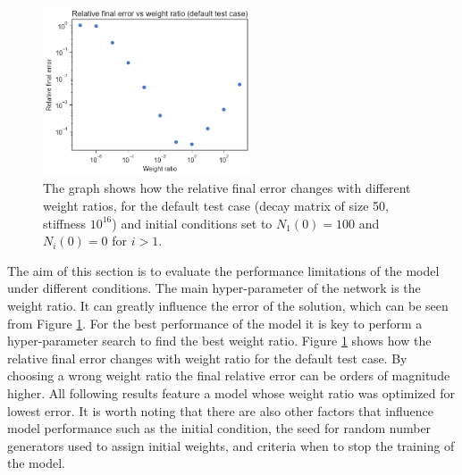 \documentclass[10pt]{article}
\begin{document}
\begin{figure}
    \centering
    \includegraphics[width=0.55\textwidth]{error_vs_ratio.png}
    \caption{The graph shows how the relative final error changes with different weight ratios, for the default test case (decay matrix of size 50, stiffness $10^{16}$) and initial conditions set to $N_1(0) = 100$ and $N_i(0) = 0$ for $i > 1$.}
    \label{fig:error_vs_ratio}
\end{figure}

The aim of this section is to evaluate the performance limitations of the model under different conditions. The main hyper-parameter of the network is the weight ratio. It can greatly influence the error of the solution, which can be seen from Figure \ref{fig:error_vs_ratio}. For the best performance of the model it is key to perform a hyper-parameter search to find the best weight ratio. Figure \ref{fig:error_vs_ratio} shows how the relative final error changes with weight ratio for the default test case. By choosing a wrong weight ratio the final relative error can be orders of magnitude higher. All following results feature a model whose weight ratio was optimized for lowest error. It is worth noting that there are also other factors that influence model performance such as the initial condition, the seed for random number generators used to assign initial weights, and criteria when to stop the training of the model.
\end{document}

